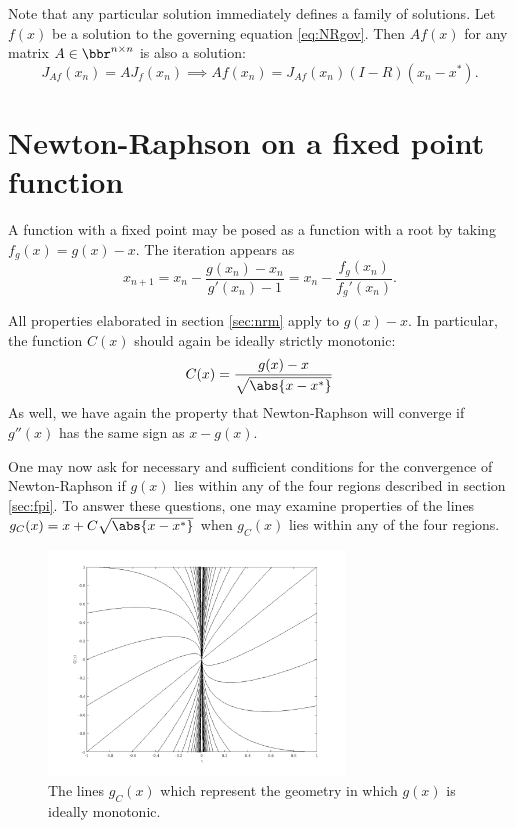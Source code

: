 \documentclass{article}
\begin{document}
Note that any particular solution immediately defines a family of solutions.
Let $f(x)$ be a solution to the governing equation \ref{eq:NRgov}.
Then $A f(x)$ for any matrix $A \in \bbr^{n \times n}$ is also a solution:
\begin{equation*}
	J_{Af}(x_n) = A J_f(x_n) \implies Af(x_n) = J_{Af}(x_n) (I-R) (x_n - x^*).
\end{equation*}

\section{Newton-Raphson on a fixed point function}
\label{sec:nrfp}

A function with a fixed point may be posed as a function with a root by taking $f_g(x) = g(x) - x$.
The iteration appears as
\begin{equation*}
x_{n+1} = x_n - \frac{g(x_n) - x_n}{g'(x_n) - 1} = x_n - \frac{f_g(x_n)}{f_g'(x_n)} .
\end{equation*}

All properties elaborated in section \ref{sec:nrm} apply to $g(x) - x$.
In particular, the function $C(x)$ should again be ideally strictly monotonic:
\begin{equation*}
C(x) = \frac{g(x) - x}{\sqrt{\abs{x-x^*}}}
\end{equation*}
As well, we have again the property that Newton-Raphson will converge if $g''(x)$ has the same sign as $x-g(x)$.

One may now ask for necessary and sufficient conditions for the convergence of Newton-Raphson if $g(x)$ lies within any of the four regions described in section \ref{sec:fpi}.
To answer these questions, one may examine properties of the lines $g_C(x) = x + C \sqrt{\abs{x-x^*}}$ when $g_C(x)$ lies within any of the four regions.

\begin{figure}
\centering
\includegraphics[width=0.7\textwidth]{clines.png}
\caption{The lines $g_C(x)$ which represent the geometry in which $g(x)$ is ideally monotonic.}
\label{fig:Clines}
\end{figure}
\end{document}
